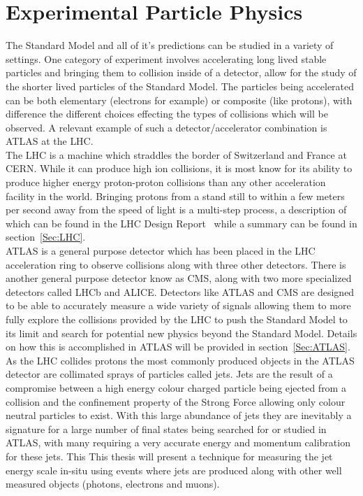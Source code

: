 \section{Experimental Particle Physics}
\label{Sec:Experi}
The Standard Model and all of it's predictions can be studied in a variety of settings.  
One category of experiment involves accelerating long lived stable particles and bringing them to collision inside of a detector, allow for the study of the shorter lived particles of the Standard Model.  
The particles being accelerated can be both elementary (electrons for example) or composite (like protons), with difference the different choices effecting the types of collisions which will be observed.  
A relevant example of such a detector/accelerator combination is \gls{ATLAS} at the \gls{LHC}.  \\

The \gls{LHC} is a machine which straddles the border of Switzerland and France at \gls{CERN}.  
While it can produce high ion collisions, it is most know for its ability to produce higher energy proton-proton collisions than any other acceleration facility in the world.   
Bringing protons from a stand still to within a few meters per second away from the speed of light is a multi-step process, a description of which can be found in the LHC Design Report~\cite{LHCDesignReport} while a summary can be found in section~\ref{Sec:LHC}.  \\

\gls{ATLAS} is a general purpose detector which has been placed in the LHC acceleration ring to observe collisions along with three other detectors.  
There is another general purpose detector know as \gls{CMS}, along with two more specialized detectors called \gls{LHCb} and \gls{ALICE}.  
Detectors like \gls{ATLAS} and \gls{CMS} are designed to be able to accurately measure a wide variety of signals allowing them to more fully explore the collisions provided by the \gls{LHC} to push the Standard Model to its limit and search for potential new physics beyond the Standard Model.  
Details on how this is accomplished in ATLAS will be provided in section~\ref{Sec:ATLAS}.  \\

As the \gls{LHC} collides protons the most commonly produced objects in the \gls{ATLAS} detector are collimated sprays of particles called jets.  
Jets are the result of a compromise between a high energy colour charged particle being ejected from a collision and the confinement property of the Strong Force allowing only colour neutral particles to exist.  
With this large abundance of jets they are inevitably a signature for a large number of final states being searched for or studied in ATLAS, with many requiring a very accurate energy and momentum calibration for these jets.  
This This thesis will present a technique for measuring the jet energy scale in-situ using events where jets are produced along with other well measured objects (photons, electrons and muons).  \\

